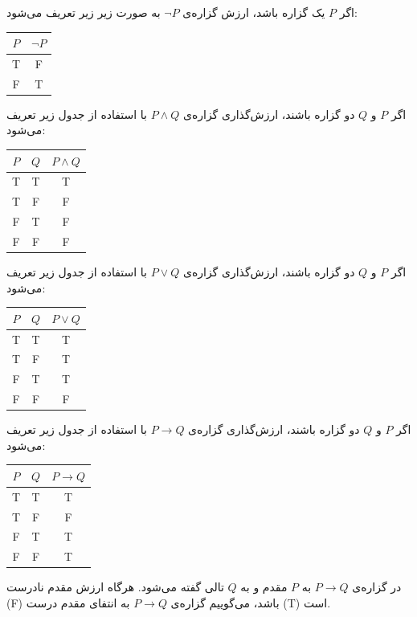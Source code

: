 اگر $P$ یک گزاره باشد، ارزش گزاره‌ی
$\neg P$
به صورت زیر زیر تعریف می‌شود:
\vspace{-0.1cm}
\begin{table}[H]
	\centering
	\begin{latin}
		\begin{tabular}{c|c}
			$P$ & $\neg P$ \\
			\hline
			T & F \\
			F & T
		\end{tabular}
	\end{latin}
\end{table}

اگر $P$ و $Q$ دو گزاره باشند، ارزش‌گذاری گزاره‌ی
$P \wedge Q$
با استفاده از جدول زیر تعریف می‌شود:
\vspace{-0.1cm}
\begin{table}[H]
	\centering
	\begin{latin}
		\begin{tabular}{c|c|c}
			$P$ & $Q$ & $P \wedge Q$ \\
			\hline
			T & T & T \\
			T & F & F \\
			F & T & F \\
			F & F & F
		\end{tabular}
	\end{latin}
\end{table}

اگر $P$ و $Q$ دو گزاره باشند، ارزش‌گذاری گزاره‌ی
$P \vee Q$
با استفاده از جدول زیر تعریف می‌شود:
\vspace{-0.1cm}
\begin{table}[H]
	\centering
	\begin{latin}
		\begin{tabular}{c|c|c}
			$P$ & $Q$ & $P \vee Q$ \\
			\hline
			T & T & T \\
			T & F & T \\
			F & T & T \\
			F & F & F
		\end{tabular}
	\end{latin}
\end{table}

اگر $P$ و $Q$ دو گزاره باشند، ارزش‌گذاری گزاره‌ی
$P \rightarrow Q$
با استفاده از جدول زیر تعریف می‌شود:
\vspace{-0.1cm}
\begin{table}[H]
	\centering
	\begin{latin}
		\begin{tabular}{c|c|c}
			$P$ & $Q$ & $P \rightarrow Q$ \\
			\hline
			T & T & T \\
			T & F & F \\
			F & T & T \\
			F & F & T
		\end{tabular}
	\end{latin}
\end{table}
در گزاره‌ی
$P \rightarrow Q$
به $P$ مقدم و به $Q$ تالی گفته می‌شود. هرگاه ارزش مقدم نادرست (F) باشد، می‌گوییم گزاره‌ی
$P \rightarrow Q$
به انتفای مقدم درست (T) است.

